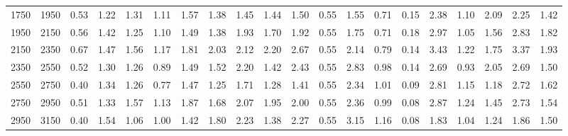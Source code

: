 \begin{landscape}
\begin{table}[p]
\begin{tabular}{rrrrrrrrrrrrrrrrrrrr}
1750 & 1950 & 0.53 & 1.22 & 1.31 & 1.11 & 1.57 & 1.38 & 1.45 & 1.44 & 1.50 & 0.55 & 1.55 & 0.71 & 0.15 & 2.38 & 1.10 & 2.09 & 2.25 & 1.42 \\
1950 & 2150 & 0.56 & 1.42 & 1.25 & 1.10 & 1.49 & 1.38 & 1.93 & 1.70 & 1.92 & 0.55 & 1.75 & 0.71 & 0.18 & 2.97 & 1.05 & 1.56 & 2.83 & 1.82 \\
2150 & 2350 & 0.67 & 1.47 & 1.56 & 1.17 & 1.81 & 2.03 & 2.12 & 2.20 & 2.67 & 0.55 & 2.14 & 0.79 & 0.14 & 3.43 & 1.22 & 1.75 & 3.37 & 1.93 \\
2350 & 2550 & 0.52 & 1.30 & 1.26 & 0.89 & 1.49 & 1.52 & 2.20 & 1.42 & 2.43 & 0.55 & 2.83 & 0.98 & 0.14 & 2.69 & 0.93 & 2.05 & 2.69 & 1.50 \\
2550 & 2750 & 0.40 & 1.34 & 1.26 & 0.77 & 1.47 & 1.25 & 1.71 & 1.28 & 1.41 & 0.55 & 2.34 & 1.01 & 0.09 & 2.81 & 1.15 & 1.18 & 2.72 & 1.62 \\
2750 & 2950 & 0.51 & 1.33 & 1.57 & 1.13 & 1.87 & 1.68 & 2.07 & 1.95 & 2.00 & 0.55 & 2.36 & 0.99 & 0.08 & 2.87 & 1.24 & 1.45 & 2.73 & 1.54 \\
2950 & 3150 & 0.40 & 1.54 & 1.06 & 1.00 & 1.42 & 1.80 & 2.23 & 1.38 & 2.27 & 0.55 & 3.15 & 1.16 & 0.08 & 1.83 & 1.04 & 1.24 & 1.86 & 1.50 \\
\bottomrule
\end{tabular}
\end{table}
\end{landscape}
